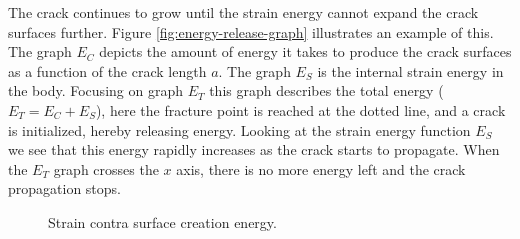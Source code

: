 


The crack continues to grow until the strain energy cannot expand 
the crack surfaces further. Figure \vref{fig:energy-release-graph}
illustrates an example of this.
%
The graph $E_C$ depicts the amount of energy it takes to produce the
crack surfaces as a function of the crack length $a$. 
%
%
The graph $E_S$ is the internal strain energy in the body.
%
Focusing on graph $E_T$ this graph describes the total
energy ($E_T = E_C + E_S$), here the fracture point is reached
at the dotted line, and a crack is initialized, hereby releasing
energy.
%
Looking at the strain energy function $E_S$ we see that this energy
rapidly increases as the crack starts to propagate.
%
When the $E_T$ graph crosses the $x$ axis, there is no more energy
left and the crack propagation stops.

\begin{figure}
  \centering
  \qquad
  \caption{Strain contra surface creation energy.}
  \label{fig:energy-graphs}
\end{figure}

